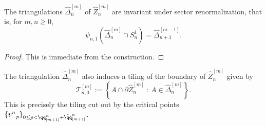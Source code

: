 \documentclass{amsart}
\begin{document}
\begin{lemma}
\label{lem:triangulation-invariance-01}
    The triangulations $\hat{\Delta}_n^{[m]}$ of $\hat{Z}_n^{[m]}$ are invariant under sector renormalization, that is, for $m, n \geq 0$,
    \[
        \psi_{n,1}(\hat{\Delta}_n^{[m]} \cap S_n^1) = \hat{\Delta}_{n+1}^{[m-1]}.
    \]
\end{lemma}

\begin{proof}
    This is immediate from the construction.
\end{proof}

The triangulation $\hat{\Delta}_n^{[m]}$ also induces a tiling of the boundary of $\hat{Z}_n^{[m]}$ given by
\begin{equation}
\label{eqn:zeroth-tiling}
    \mathscr{T}_{n,0}^{[m]} := \left\{ A \cap \partial \hat{Z}_n^{[m]} \: : \: A \in \hat{\Delta}_n^{[m]} \right\}.
\end{equation}
This is precisely the tiling cut out by the critical points $\{ v^n_{-p} \}_{0 \leq p < \qq^n_{[m+1]} + \check{\qq}^n_{[m+1]} }$.
\end{document}
